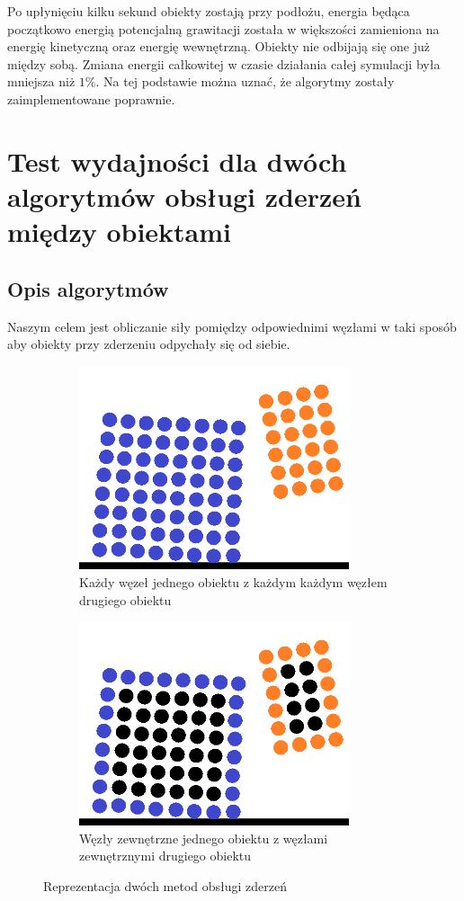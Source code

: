 \documentclass[12pt, letterpaper]{report}
\begin{document}
    Po upłynięciu kilku sekund obiekty zostają przy podłożu, energia będąca początkowo energią
    potencjalną grawitacji została w większości zamieniona na energię kinetyczną oraz energię
    wewnętrzną. Obiekty nie odbijają się one już między sobą.
    Zmiana energii całkowitej w czasie działania całej symulacji była mniejsza niż $1\%$. Na tej
    podstawie można uznać, że algorytmy zostały zaimplementowane poprawnie.

    \section{Test wydajności dla dwóch algorytmów obsługi zderzeń między obiektami}
    \subsection{Opis algorytmów}
    Naszym celem jest obliczanie siły pomiędzy odpowiednimi węzłami w taki sposób aby 
    obiekty przy zderzeniu odpychały się od siebie.
    
    \begin{figure}[h]
        \centering
        \begin{subfigure}[t]{0.4\textwidth}
            \includegraphics[width=\textwidth, height=6cm]{objects_unoptimized} 
            \caption{Każdy węzeł jednego obiektu z każdym każdym węzłem drugiego obiektu}
        \end{subfigure}
        \begin{subfigure}[t]{0.4\textwidth}
            \includegraphics[width=\textwidth, height=6cm]{objects_optimized}
            \caption{Węzły zewnętrzne jednego obiektu z węzłami zewnętrznymi drugiego obiektu}
        \end{subfigure}
        \caption{Reprezentacja dwóch metod obsługi zderzeń}
    \end{figure}
\end{document}
